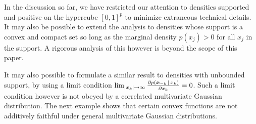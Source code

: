 
In the discussion so far, we have restricted our attention to
densities supported and positive on the hypercube $[0,1]^p$ to
minimize extraneous technical details. It may also be possible to extend
the analysis to densities whose support is a convex and compact set so
long as the marginal density $p(x_j) > 0$ for all $x_j$ in the
support. A rigorous analysis of this however is beyond the scope of
this paper.

It may also possible to formulate a similar result to densities with
unbounded support, by using a limit condition $\lim_{|x_k| \rightarrow
  \infty} \frac{\partial p(\mbox{\boldmath $\scriptstyle x$}_{-k} {\,|\,}
  x_k)}{\partial x_k} = 0$.  Such a limit condition however is not
obeyed by a correlated multivariate Gaussian distribution.  The next
example shows that certain convex functions are not additively
faithful under general multivariate Gaussian distributions.

